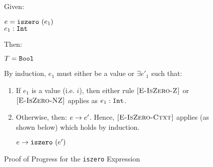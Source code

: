 \documentclass{report}
\newcommand{\rel}[1]{ \mbox{\sc [#1]} }
\begin{document}
\begin{figure}[ht!]
Given:
\begin{center}
  $e = \mbox{\tt iszero}~(e_1)$ \\
  ${e_1} : {\mbox{\tt Int}}$
\end{center}
Then:~\\
\begin{center}
   $T = \mbox{\tt Bool}$
\end{center}

By induction, $e_1$ must either be a value or $\exists e'_1$ such that:~\\

	\begin{enumerate}
    \item If $e_1$ is a value (i.e. $i$), then either rule $\rel{E-IsZero-Z}$ or $\rel{E-IsZero-NZ}$ applies as ${e_1} : {\mbox{\tt Int}}$.
      
    \item Otherwise, then: ${e} \rightarrow {e'}$.  Hence, $\rel{E-IsZero-Ctxt}$ applies (as shown below) which holds by induction.
    
    \begin{center}
      ${e} \rightarrow {\mbox{\tt iszero}~(e')}$
    \end{center}
	
	\end{enumerate}
	
  \caption{Proof of Progress for the \texttt{iszero} Expression}\label{fig:isZeroProofProgress}
\end{figure}
\end{document}
